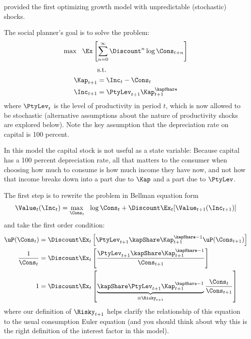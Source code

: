 
\cite{brockmirman:growth} provided the first optimizing growth model with unpredictable (stochastic) shocks.

The social planner's goal is to solve the problem:
\begin{equation}
        \max ~~ \Ex\left[ \sum_{n=0}^{\infty} \Discount^{n} \log \Cons_{t+n}\right]
\end{equation}
\begin{equation}\begin{gathered}\begin{aligned}
         & \text{s.t.}  \nonumber
\\      \Kap_{t+1} & =  \Inc_{t}-\Cons_{t} \label{eq:delk}
  \\  \Inc_{t+1}   & =  \PtyLev_{t+1} \Kap_{t+1}^{\kapShare}
\end{aligned}\end{gathered}\end{equation}
where $\PtyLev_{t}$ is the level of productivity in period $t$, which is now allowed to be stochastic (alternative assumptions about the nature of productivity shocks are explored below).  Note the key assumption
that the depreciation rate on capital is 100 percent.  %

In this model the capital stock is not useful as a state variable: Because capital has a 100 percent depreciation rate, all that matters to the consumer when choosing how much to consume is how much income they have now, and not how that income breaks down into a part due to $\Kap$ and a part due to $\PtyLev$.

The first step is to rewrite the problem in Bellman equation form
\begin{equation}
        \Value_{t}(\Inc_{t}) = \max_{\Cons_{t}} ~~ \log \Cons_{t} + \Discount \Ex_{t} [\Value_{t+1}(\Inc_{t+1})]
\end{equation}
and take the first order condition:
\begin{equation*}\begin{gathered}\begin{aligned}
        \uP(\Cons_{t}) & =  \Discount \Ex_{t}\left[\PtyLev_{t+1} \kapShare \Kap_{t+1}^{\kapShare-1} \uP(\Cons_{t+1})\right]  \\
        \frac{1}{\Cons_{t}} & =  \Discount \Ex_{t}\left[\frac{\PtyLev_{t+1} \kapShare \Kap_{t+1}^{\kapShare-1}}{\Cons_{t+1}}\right]  \\
        1 & =  \Discount \Ex_{t} \left[\underbrace{\kapShare \PtyLev_{t+1} \Kap_{t+1}^{\kapShare-1}}_{\equiv \Risky_{t+1}}\frac{\Cons_{t}}{\Cons_{t+1}}\right]
\end{aligned}\end{gathered}\end{equation*}
where our definition of $\Risky_{t+1}$ helps clarify the relationship of this equation
to the usual consumption Euler equation (and you should think about why this is the
right definition of the interest factor in this model).

